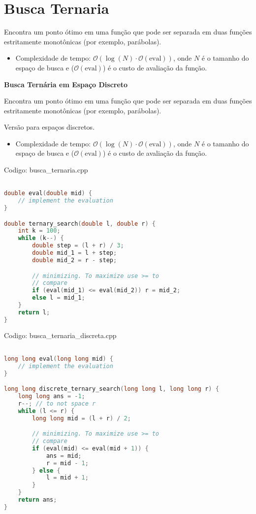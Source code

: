 \documentclass[10pt, a4paper, oneside]{book}
\begin{document}
\section{Busca Ternaria}


Encontra um ponto ótimo em uma função que pode ser separada em duas funções estritamente monotônicas (por exemplo, parábolas).



\begin{itemize}
\item Complexidade de tempo: $\mathcal{O}(\log(N) \cdot \mathcal{O}(\text{eval}))$, onde $N$ é o tamanho do espaço de busca e ($\mathcal{O}(\text{eval})$) é o custo de avaliação da função.
\end{itemize}



\textbf{Busca Ternária em Espaço Discreto} 



Encontra um ponto ótimo em uma função que pode ser separada em duas funções estritamente monotônicas (por exemplo, parábolas).

Versão para espaços discretos.



\begin{itemize}
\item Complexidade de tempo: $\mathcal{O}(\log(N) \cdot \mathcal{O}(\text{eval}))$, onde $N$ é o tamanho do espaço de busca e ($\mathcal{O}(\text{eval})$) é o custo de avaliação da função.
\end{itemize}

\hfill

Codigo: busca\_ternaria.cpp

\begin{lstlisting}[language=C++]

double eval(double mid) {
    // implement the evaluation
}

double ternary_search(double l, double r) {
    int k = 100;
    while (k--) {
        double step = (l + r) / 3;
        double mid_1 = l + step;
        double mid_2 = r - step;

        // minimizing. To maximize use >= to
        // compare
        if (eval(mid_1) <= eval(mid_2)) r = mid_2;
        else l = mid_1;
    }
    return l;
}
\end{lstlisting}
\hfill

Codigo: busca\_ternaria\_discreta.cpp

\begin{lstlisting}[language=C++]

long long eval(long long mid) {
    // implement the evaluation
}

long long discrete_ternary_search(long long l, long long r) {
    long long ans = -1;
    r--; // to not space r
    while (l <= r) {
        long long mid = (l + r) / 2;

        // minimizing. To maximize use >= to
        // compare
        if (eval(mid) <= eval(mid + 1)) {
            ans = mid;
            r = mid - 1;
        } else {
            l = mid + 1;
        }
    }
    return ans;
}
\end{lstlisting}
\hfill
\end{document}
